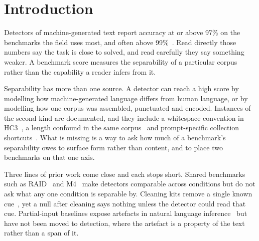\section{Introduction}

Detectors of machine-generated text report accuracy at or above 97\% on the benchmarks the field uses most, and often above 99\%~\cite{Guo2023close,Su2023plus,Zhou2024exploiting}. Read directly those numbers say the task is close to solved, and read carefully they say something weaker. A benchmark score measures the separability of a particular corpus rather than the capability a reader infers from it.

Separability has more than one source. A detector can reach a high score by modelling how machine-generated language differs from human language, or by modelling how one corpus was assembled, punctuated and encoded. Instances of the second kind are documented, and they include a whitespace convention in HC3~\cite{Tian2023multiscale}, a length confound in the same corpus~\cite{Baidya2026detecting} and prompt-specific collection shortcuts~\cite{Park2024investigating}. What is missing is a way to ask how much of a benchmark's separability owes to surface form rather than content, and to place two benchmarks on that one axis.

Three lines of prior work come close and each stops short. Shared benchmarks such as RAID~\cite{Dugan2024raid} and M4~\cite{Wang2024m4} make detectors comparable across conditions but do not ask what any one condition is separable by. Cleaning kits remove a single known cue~\cite{Tian2023multiscale}, yet a null after cleaning says nothing unless the detector could read that cue. Partial-input baselines expose artefacts in natural language inference~\cite{Gururangan2018annotation,Poliak2018hypothesis} but have not been moved to detection, where the artefact is a property of the text rather than a span of it.

